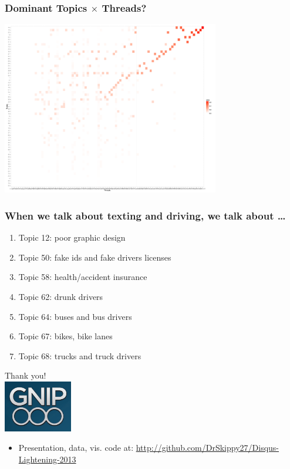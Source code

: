 \documentclass{beamer}
\begin{document}
\begin{frame}\frametitle{Dominant Topics $\times$ Threads?}
  \begin{center}
    \includegraphics[width=9.5cm]{./imgs/gg_heat.pdf}
  \end{center}
\end{frame}

\begin{frame}\frametitle{When we talk about texting and driving, we talk about \ldots}
\begin{center}
{\Large 
\begin{enumerate}
\item Topic 12: poor graphic design
\item Topic 50: fake ids and fake drivers licenses
\item Topic 58: health/accident insurance
\item Topic 62: drunk drivers
\item Topic 64: buses and bus drivers
\item Topic 67: bikes, bike lanes
\item Topic 68: trucks and truck drivers
\end{enumerate}
}
\end{center}
\end{frame}

\begin{frame}
  \begin{center}
    {\Large Thank you!}  \\ [20pt]
    \includegraphics[width=3cm]{./imgs/logo.png} \\ [15pt]
    \begin{itemize}
    \item Presentation, data, vis. code at: \url{http://github.com/DrSkippy27/Disqus-Lightening-2013}
    \end{itemize}
  \end{center}
\end{frame}
\end{document}
